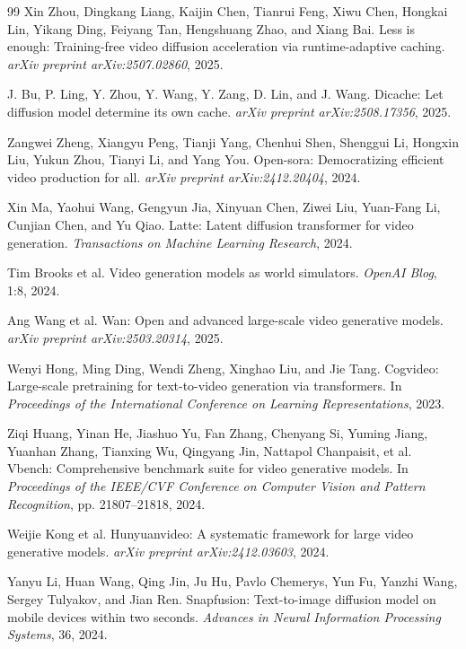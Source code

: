 \documentclass{article}
\begin{document}
\begin{thebibliography}{99}
Xin Zhou, Dingkang Liang, Kaijin Chen, Tianrui Feng, Xiwu Chen, Hongkai Lin, Yikang Ding, Feiyang Tan, Hengshuang Zhao, and Xiang Bai.
\newblock Less is enough: Training-free video diffusion acceleration via runtime-adaptive caching.
\newblock \textit{arXiv preprint arXiv:2507.02860}, 2025.

J. Bu, P. Ling, Y. Zhou, Y. Wang, Y. Zang, D. Lin, and J. Wang.
\newblock Dicache: Let diffusion model determine its own cache.
\newblock \textit{arXiv preprint arXiv:2508.17356}, 2025.

Zangwei Zheng, Xiangyu Peng, Tianji Yang, Chenhui Shen, Shenggui Li, Hongxin Liu, Yukun Zhou, Tianyi Li, and Yang You.
\newblock Open-sora: Democratizing efficient video production for all.
\newblock \textit{arXiv preprint arXiv:2412.20404}, 2024.

Xin Ma, Yaohui Wang, Gengyun Jia, Xinyuan Chen, Ziwei Liu, Yuan-Fang Li, Cunjian Chen, and Yu Qiao.
\newblock Latte: Latent diffusion transformer for video generation.
\newblock \textit{Transactions on Machine Learning Research}, 2024.

Tim Brooks et al.
\newblock Video generation models as world simulators.
\newblock \textit{OpenAI Blog}, 1:8, 2024.

Ang Wang et al.
\newblock Wan: Open and advanced large-scale video generative models.
\newblock \textit{arXiv preprint arXiv:2503.20314}, 2025.

Wenyi Hong, Ming Ding, Wendi Zheng, Xinghao Liu, and Jie Tang.
\newblock Cogvideo: Large-scale pretraining for text-to-video generation via transformers.
\newblock In \textit{Proceedings of the International Conference on Learning Representations}, 2023.

Ziqi Huang, Yinan He, Jiashuo Yu, Fan Zhang, Chenyang Si, Yuming Jiang, Yuanhan Zhang, Tianxing Wu, Qingyang Jin, Nattapol Chanpaisit, et al.
\newblock Vbench: Comprehensive benchmark suite for video generative models.
\newblock In \textit{Proceedings of the IEEE/CVF Conference on Computer Vision and Pattern Recognition}, pp. 21807--21818, 2024.

Weijie Kong et al.
\newblock Hunyuanvideo: A systematic framework for large video generative models.
\newblock \textit{arXiv preprint arXiv:2412.03603}, 2024.

Yanyu Li, Huan Wang, Qing Jin, Ju Hu, Pavlo Chemerys, Yun Fu, Yanzhi Wang, Sergey Tulyakov, and Jian Ren.
\newblock Snapfusion: Text-to-image diffusion model on mobile devices within two seconds.
\newblock \textit{Advances in Neural Information Processing Systems}, 36, 2024.



\end{thebibliography}
\end{document}
